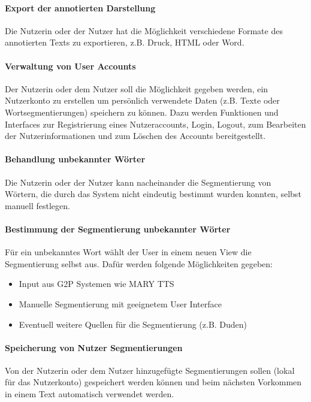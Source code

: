\paragraph{Export der annotierten Darstellung}
Die Nutzerin oder der Nutzer hat die Möglichkeit verschiedene Formate des annotierten Texts zu exportieren, z.B. Druck, HTML oder Word.

\paragraph{Verwaltung von User Accounts}
Der Nutzerin oder dem Nutzer soll die Möglichkeit gegeben werden, ein Nutzerkonto zu erstellen um persönlich verwendete Daten (z.B. Texte oder Wortsegmentierungen) speichern zu können. Dazu werden Funktionen und Interfaces zur Registrierung eines Nutzeraccounts, Login, Logout, zum Bearbeiten der Nutzerinformationen und zum Löschen des Accounts bereitgestellt.

\paragraph{Behandlung unbekannter Wörter}
Die Nutzerin oder der Nutzer kann nacheinander die Segmentierung von Wörtern, die durch das System nicht eindeutig bestimmt wurden konnten, selbst manuell festlegen.

\paragraph{Bestimmung der Segmentierung unbekannter Wörter}
Für ein unbekanntes Wort wählt der User in einem neuen View die Segmentierung selbst aus. Dafür werden folgende Möglichkeiten gegeben:
\begin{itemize}
	\item Input aus G2P Systemen wie MARY TTS
	\item Manuelle Segmentierung mit geeignetem User Interface
	\item Eventuell weitere Quellen für die Segmentierung (z.B. Duden)
\end{itemize}

\paragraph{Speicherung von Nutzer Segmentierungen}
Von der Nutzerin oder dem Nutzer hinzugefügte Segmentierungen sollen (lokal für das Nutzerkonto) gespeichert werden können und beim nächsten Vorkommen in einem Text automatisch verwendet werden.

